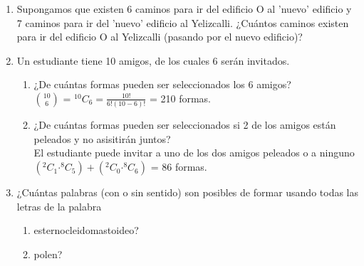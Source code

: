 \documentclass[12pt,a4paper]{report}
\newcommand*{\Comb}[2]{{}^{#1}C_{#2}}
\begin{document}
\begin{enumerate}
   \item {
   Supongamos que existen 6 caminos para ir del edificio O al ’nuevo’
   edificio y 7 caminos para ir del ’nuevo’ edificio al Yelizcalli.
   ¿Cuántos caminos existen para ir del edificio O al Yelizcalli
   (pasando por el nuevo edificio)?\\
	
	
	}

   \item {
    Un estudiante tiene 10 amigos, de los cuales 6 serán invitados.\\
		\begin{enumerate}
		\item{
		¿De cuántas formas pueden ser seleccionados los 6 amigos?\\
		
		$10 \choose 6 $ = $\Comb{10}{6}=\frac{10!}{6!(10-6)!}$ = 210 formas.\\
		}
		
		\item{
        ¿De cuántas formas pueden ser seleccionados si 2 de los amigos están
        peleados y no asisitirán juntos?\\
            
        El estudiante puede invitar a uno de los dos amigos peleados o a ninguno \\
          
         $(\Comb{2}{1} \boldsymbol{\cdot} \Comb{8}{5}) +(\Comb{2}{0} \boldsymbol{\cdot} \Comb{8}{6})$ = 86 formas.\\                   
		}
	\end{enumerate}
	}
	

   \item {
    ¿Cuántas palabras (con o sin sentido) son posibles de formar usando todas
    las letras de la palabra\\

	\begin{enumerate}
   \item {
	esternocleidomastoideo?\\
	
   }
   
   \item {
   polen?\\
   
   }
	\end{enumerate}
      
}
\end{enumerate}
\end{document}
